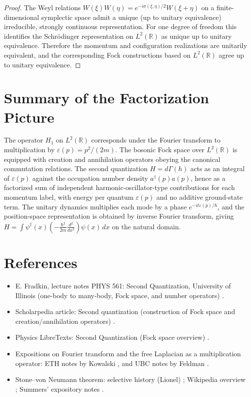 \documentclass[11pt]{article}
\theoremstyle{definition}
\theoremstyle{plain}
\numberwithin{equation}{section}
\begin{document}
\begin{proof}
The Weyl relations $W(\xi)W(\eta)=e^{-i\sigma(\xi,\eta)/2}W(\xi+\eta)$ on a finite-dimensional symplectic space admit a unique (up to unitary equivalence) irreducible, strongly continuous representation. For one degree of freedom this identifies the Schr\"odinger representation on $L^2(\mathbb{R})$ as unique up to unitary equivalence. Therefore the momentum and configuration realizations are unitarily equivalent, and the corresponding Fock constructions based on $L^2(\mathbb{R})$ agree up to unitary equivalence.\end{proof}

\section{Summary of the Factorization Picture}

The operator $H_1$ on $L^2(\mathbb{R})$ corresponds under the Fourier transform to multiplication by $\varepsilon(p)=p^2/(2m)$. The bosonic Fock space over $L^2(\mathbb{R})$ is equipped with creation and annihilation operators obeying the canonical commutation relations. The second quantization $H=d\Gamma(h)$ acts as an integral of $\varepsilon(p)$ against the occupation number density $a^\dagger(p)a(p)$, hence as a factorized sum of independent harmonic-oscillator-type contributions for each momentum label, with energy per quantum $\varepsilon(p)$ and no additive ground-state term. The unitary dynamics multiplies each mode by a phase $e^{-it\varepsilon(p)/\hbar}$, and the position-space representation is obtained by inverse Fourier transform, giving $H=\int \psi^\dagger(x)\left(-\frac{\hbar^2}{2m}\frac{d^2}{dx^2}\right)\psi(x)\,dx$ on the natural domain.

\section*{References}
\vspace{-0.5em}
\begin{itemize}
\item E. Fradkin, lecture notes PHYS 561: Second Quantization, University of Illinois (one-body to many-body, Fock space, and number operators) \cite{uiuc561}.
\item Scholarpedia article: Second quantization (construction of Fock space and creation/annihilation operators) \cite{scholarpedia}.
\item Physics LibreTexts: Second Quantization (Fock space overview) \cite{libresecond}.
\item Expositions on Fourier transform and the free Laplacian as a multiplication operator: ETH notes by Kowalski \cite{kowalskispectral}, and UBC notes by Feldman \cite{feldmanlaplacian}.
\item Stone--von Neumann theorem: selective history (Lionel) \cite{svnhistory}; Wikipedia overview \cite{svn-wiki}; Summers' expository notes \cite{summerssvn}.
\end{itemize}
\end{document}

